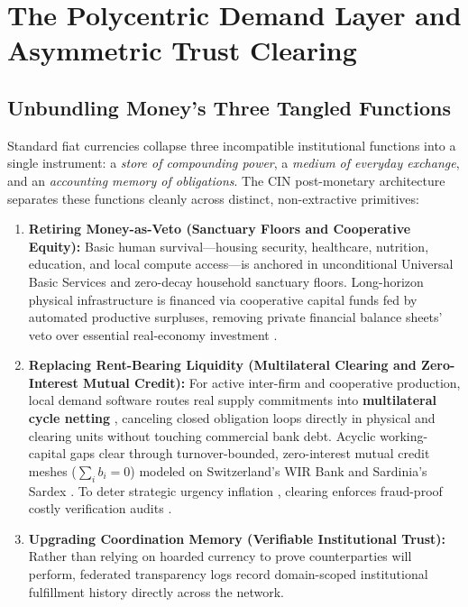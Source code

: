 \documentclass[11pt]{article}
\begin{document}
\section{The Polycentric Demand Layer and Asymmetric Trust Clearing}\label{sec:clearing}

\subsection{Unbundling Money's Three Tangled Functions}

Standard fiat currencies collapse three incompatible institutional functions into a single instrument: a \emph{store of compounding power}, a \emph{medium of everyday exchange}, and an \emph{accounting memory of obligations}. The CIN post-monetary architecture separates these functions cleanly across distinct, non-extractive primitives:
\begin{enumerate}
  \item \textbf{Retiring Money-as-Veto (Sanctuary Floors and Cooperative Equity):} Basic human survival---housing security, healthcare, nutrition, education, and local compute access---is anchored in unconditional Universal Basic Services and zero-decay household sanctuary floors. Long-horizon physical infrastructure is financed via \citet{meidner1978funds} cooperative capital funds fed by automated productive surpluses, removing private financial balance sheets' veto over essential real-economy investment \citep{polanyi1944great, mason2026against}.
  \item \textbf{Replacing Rent-Bearing Liquidity (Multilateral Clearing and Zero-Interest Mutual Credit):} For active inter-firm and cooperative production, local demand software routes real supply commitments into \textbf{multilateral cycle netting} \citep{fleischman2026cycles}, canceling closed obligation loops directly in physical and clearing units without touching commercial bank debt. Acyclic working-capital gaps clear through turnover-bounded, zero-interest mutual credit meshes ($\sum_{i} b_i = 0$) modeled on Switzerland's WIR Bank \citep{stodder2009wir} and Sardinia's Sardex \citep{iosifidis2018sardex}. To deter strategic urgency inflation \citep{hurwicz1972decentralized}, clearing enforces fraud-proof costly verification audits \citep{perezrichet2022falsification}.
  \item \textbf{Upgrading Coordination Memory (Verifiable Institutional Trust):} Rather than relying on hoarded currency to prove counterparties will perform, federated transparency logs record domain-scoped institutional fulfillment history directly across the network.
\end{enumerate}
\end{document}
